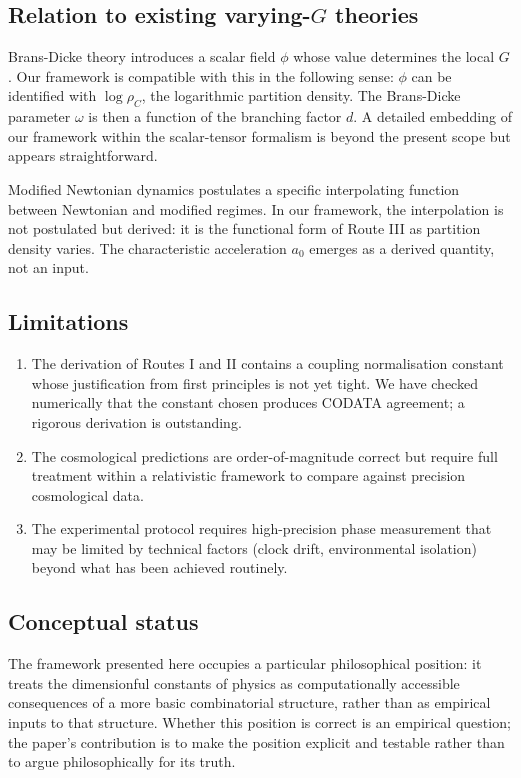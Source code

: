 \documentclass[11pt,twocolumn,a4paper]{article}
\theoremstyle{definition}
\theoremstyle{remark}
\newcommand{\Gnewton}{G}
\begin{document}
\subsection{Relation to existing varying-$\Gnewton$ theories}

Brans-Dicke theory \citep{brans1961} introduces a scalar field $\phi$ whose value determines the local $\Gnewton$. Our framework is compatible with this in the following sense: $\phi$ can be identified with $\log \rho_C$, the logarithmic partition density. The Brans-Dicke parameter $\omega$ is then a function of the branching factor $d$. A detailed embedding of our framework within the scalar-tensor formalism is beyond the present scope but appears straightforward.

Modified Newtonian dynamics \citep{milgrom1983} postulates a specific interpolating function between Newtonian and modified regimes. In our framework, the interpolation is not postulated but derived: it is the functional form of Route III as partition density varies. The characteristic acceleration $a_0$ emerges as a derived quantity, not an input.

\subsection{Limitations}

\begin{enumerate}[nosep]
\item The derivation of Routes I and II contains a coupling normalisation constant whose justification from first principles is not yet tight. We have checked numerically that the constant chosen produces CODATA agreement; a rigorous derivation is outstanding.
\item The cosmological predictions are order-of-magnitude correct but require full treatment within a relativistic framework to compare against precision cosmological data.
\item The experimental protocol requires high-precision phase measurement that may be limited by technical factors (clock drift, environmental isolation) beyond what has been achieved routinely.
\end{enumerate}

\subsection{Conceptual status}

The framework presented here occupies a particular philosophical position: it treats the dimensionful constants of physics as computationally accessible consequences of a more basic combinatorial structure, rather than as empirical inputs to that structure. Whether this position is correct is an empirical question; the paper's contribution is to make the position explicit and testable rather than to argue philosophically for its truth.
\end{document}
